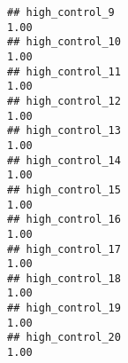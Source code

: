\documentclass[
]{article}
\begin{document}
\begin{verbatim}
## high_control_9                                                                                                                                                                                                                 1.00
## high_control_10                                                                                                                                                                                                                1.00
## high_control_11                                                                                                                                                                                                                1.00
## high_control_12                                                                                                                                                                                                                1.00
## high_control_13                                                                                                                                                                                                                1.00
## high_control_14                                                                                                                                                                                                                1.00
## high_control_15                                                                                                                                                                                                                1.00
## high_control_16                                                                                                                                                                                                                1.00
## high_control_17                                                                                                                                                                                                                1.00
## high_control_18                                                                                                                                                                                                                1.00
## high_control_19                                                                                                                                                                                                                1.00
## high_control_20                                                                                                                                                                                                                1.00

\end{verbatim}
\end{document}

